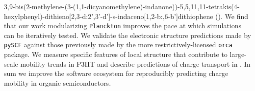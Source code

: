 3,9-bis(2-methylene-(3-(1,1-dicyanomethylene)-indanone))-5,5,11,11-tetrakis(4-hexylphenyl)-dithieno[2,3-d:2’,3’-d’]-s-indaceno[1,2-b:,6-b’]dithiophene ().
We find that our work modularizing \texttt{Planckton} improves the pace at which simulations can be iteratively tested.
We validate the electronic structure predictions made by \texttt{pySCF} against those previously made by the more restrictively-licensed \texttt{orca} package.
We measure specific features of local structure that contribute to large-scale mobility trends in P3HT and describe predictions of charge transport in .
In sum we improve the software ecosystem for reproducibly predicting charge mobility in organic semiconductors.


